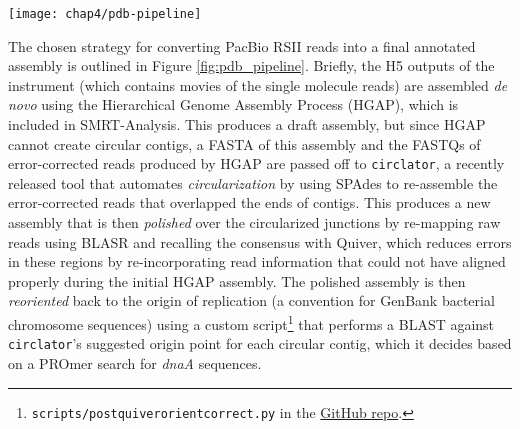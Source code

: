 \begin{figure*}[hb]
  \texttt{[image: chap4/pdb-pipeline]}               
  \caption[Outline of steps automated by \pathogendbpipeline]{\textbf{Outline of steps automated by \pathogendbpipeline.} Processes are depicted as boxes, with processes requiring potentially multiple runs indicated as a ``stack.'' An interim file format is depicted as a single arrow, and groups of files as doubled arrows. The pipeline concludes with deposition of a link to an IGB Quickload Directory for the completed assembly into PathogenDB.}
  \label{fig:pdb_pipeline}
\end{figure*}

The chosen strategy for converting PacBio RSII reads into a final annotated assembly is outlined in Figure \ref{fig:pdb_pipeline}. Briefly, the H5 outputs of the instrument (which contains movies of the single molecule reads) are assembled \emph{de novo} using the Hierarchical Genome Assembly Process\autocite{Chin2013} (HGAP), which is included in SMRT-Analysis. This produces a draft assembly, but since HGAP cannot create circular contigs, a FASTA of this assembly and the FASTQs of error-corrected reads produced by HGAP are passed off to \texttt{circlator},\autocite{Hunt2015} a recently released tool that automates \emph{circularization} by using SPAdes\autocite{Bankevich2012} to re-assemble the error-corrected reads that overlapped the ends of contigs. This produces a new assembly that is then \emph{polished} over the circularized junctions by re-mapping raw reads using BLASR\autocite{Chaisson2012} and recalling the consensus with Quiver,\autocite{Chin2013} which reduces errors in these regions by re-incorporating read information that could not have aligned properly during the initial HGAP assembly. The polished assembly is then \emph{reoriented} back to the origin of replication (a convention for GenBank bacterial chromosome sequences) using a custom script\footnote{ \texttt{scripts/post\textunderscore quiver\textunderscore orient\textunderscore correct.py} in the \href{https://github.com/powerpak/pathogendb-pipeline/blob/master/scripts/post\textunderscore quiver\textunderscore orient\textunderscore correct.py}{GitHub repo}.} that performs a BLAST against \texttt{circlator}'s suggested origin point for each circular contig, which it decides based on a PROmer\autocite{Kurtz2004} search for \emph{dnaA} sequences.

